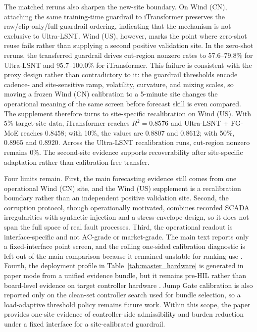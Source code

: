 \documentclass[review,1p,times]{elsarticle}
\begin{document}
The matched reruns also sharpen the new-site boundary. On Wind (CN), attaching the same training-time guardrail to iTransformer preserves the raw/clip-only/full-guardrail ordering, indicating that the mechanism is not exclusive to Ultra-LSNT. Wind (US), however, marks the point where zero-shot reuse fails rather than supplying a second positive validation site. In the zero-shot reruns, the transferred guardrail drives cut-region nonzero rates to 57.6--79.8\% for Ultra-LSNT and 95.7--100.0\% for iTransformer. This failure is consistent with the proxy design rather than contradictory to it: the guardrail thresholds encode cadence- and site-sensitive ramp, volatility, curvature, and mixing scales, so moving a frozen Wind (CN) calibration to a 5-minute site changes the operational meaning of the same screen before forecast skill is even compared. The supplement therefore turns to site-specific recalibration on Wind (US). With 5\% target-site data, iTransformer reaches $R^2=0.8576$ and Ultra-LSNT + FG-MoE reaches $0.8458$; with 10\%, the values are $0.8807$ and $0.8612$; with 50\%, $0.8965$ and $0.8920$. Across the Ultra-LSNT recalibration runs, cut-region nonzero remains 0\%. The second-site evidence supports recoverability after site-specific adaptation rather than calibration-free transfer.

Four limits remain. First, the main forecasting evidence still comes from one operational Wind (CN) site, and the Wind (US) supplement is a recalibration boundary rather than an independent positive validation site. Second, the corruption protocol, though operationally motivated, combines recorded SCADA irregularities with synthetic injection and a stress-envelope design, so it does not span the full space of real fault processes. Third, the operational readout is interface-specific and not AC-grade or market-grade. The main text reports only a fixed-interface point screen, and the rolling one-sided calibration diagnostic is left out of the main comparison because it remained unstable for ranking use \citep{larrahondo2021acdcomp}. Fourth, the deployment profile in Table~\ref{tab:master_hardware} is generated in paper mode from a unified evidence bundle, but it remains pre-HIL rather than board-level evidence on target controller hardware \citep{ren2020scada}. Jump Gate calibration is also reported only on the clean-set controller search used for bundle selection, so a load-adaptive threshold policy remains future work. Within this scope, the paper provides one-site evidence of controller-side admissibility and burden reduction under a fixed interface for a site-calibrated guardrail.
\end{document}

